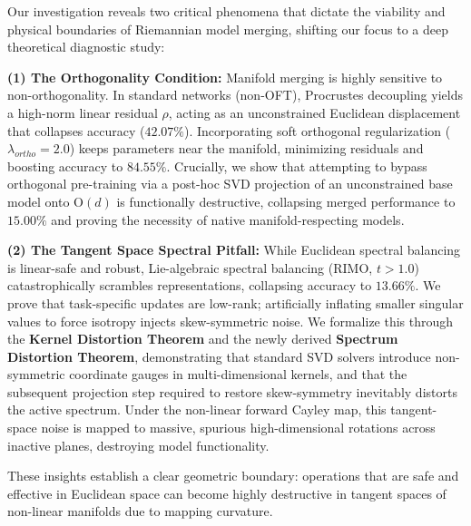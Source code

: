 Our investigation reveals two critical phenomena that dictate the viability and physical boundaries of Riemannian model merging, shifting our focus to a deep theoretical diagnostic study:

\textbf{(1) The Orthogonality Condition:} Manifold merging is highly sensitive to non-orthogonality. In standard networks (non-OFT), Procrustes decoupling yields a high-norm linear residual $\rho$, acting as an unconstrained Euclidean displacement that collapses accuracy ($42.07\%$). Incorporating soft orthogonal regularization ($\lambda_{ortho}=2.0$) keeps parameters near the manifold, minimizing residuals and boosting accuracy to $84.55\%$. Crucially, we show that attempting to bypass orthogonal pre-training via a post-hoc SVD projection of an unconstrained base model onto $\mathrm{O}(d)$ is functionally destructive, collapsing merged performance to $15.00\%$ and proving the necessity of native manifold-respecting models.

\textbf{(2) The Tangent Space Spectral Pitfall:} While Euclidean spectral balancing is linear-safe and robust, Lie-algebraic spectral balancing (RIMO, $t > 1.0$) catastrophically scrambles representations, collapsing accuracy to $13.66\%$. We prove that task-specific updates are low-rank; artificially inflating smaller singular values to force isotropy injects skew-symmetric noise. We formalize this through the \textbf{Kernel Distortion Theorem} and the newly derived \textbf{Spectrum Distortion Theorem}, demonstrating that standard SVD solvers introduce non-symmetric coordinate gauges in multi-dimensional kernels, and that the subsequent projection step required to restore skew-symmetry inevitably distorts the active spectrum. Under the non-linear forward Cayley map, this tangent-space noise is mapped to massive, spurious high-dimensional rotations across inactive planes, destroying model functionality.

These insights establish a clear geometric boundary: operations that are safe and effective in Euclidean space can become highly destructive in tangent spaces of non-linear manifolds due to mapping curvature.

